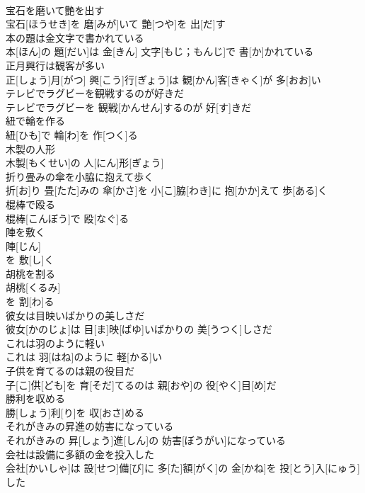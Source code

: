 \documentclass[8pt]{extreport}
\begin{document}
\begin{CJK}{UTF8}{min}
\\	宝石を磨いて艶を出す	
\\	宝石[ほうせき]を 磨[みが]いて 艶[つや]を 出[だ]す
\\	本の題は金文字で書かれている	
\\	本[ほん]の 題[だい]は 金[きん] 文字[もじ；もんじ]で 書[か]かれている
\\	正月興行は観客が多い	
\\	正[しょう]月[がつ] 興[こう]行[ぎょう]は 観[かん]客[きゃく]が 多[おお]い
\\	テレビでラグビーを観戦するのが好きだ	
\\	テレビでラグビーを 観戦[かんせん]するのが 好[す]きだ
\\	紐で輪を作る	
\\	紐[ひも]で 輪[わ]を 作[つく]る
\\	木製の人形	
\\	木製[もくせい]の 人[にん]形[ぎょう]
\\	折り畳みの傘を小脇に抱えて歩く	
\\	折[お]り 畳[たた]みの 傘[かさ]を 小[こ]脇[わき]に 抱[かか]えて 歩[ある]く
\\	棍棒で殴る	
\\	棍棒[こんぼう]で 殴[なぐ]る
\\	陣を敷く	
\\	陣[じん]
\\	を 敷[し]く 
\\	胡桃を割る	
\\	胡桃[くるみ]
\\	を 割[わ]る 
\\	彼女は目映いばかりの美しさだ	
\\	彼女[かのじょ]は 目[ま]映[ばゆ]いばかりの 美[うつく]しさだ
\\	これは羽のように軽い	
\\	これは 羽[はね]のように 軽[かる]い
\\	子供を育てるのは親の役目だ	
\\	子[こ]供[ども]を 育[そだ]てるのは 親[おや]の 役[やく]目[め]だ
\\	勝利を収める	
\\	勝[しょう]利[り]を 収[おさ]める
\\	それがきみの昇進の妨害になっている	
\\	それがきみの 昇[しょう]進[しん]の 妨害[ぼうがい]になっている
\\	会社は設備に多額の金を投入した	
\\	会社[かいしゃ]は 設[せつ]備[び]に 多[た]額[がく]の 金[かね]を 投[とう]入[にゅう]した

\end{CJK}
\end{document}

